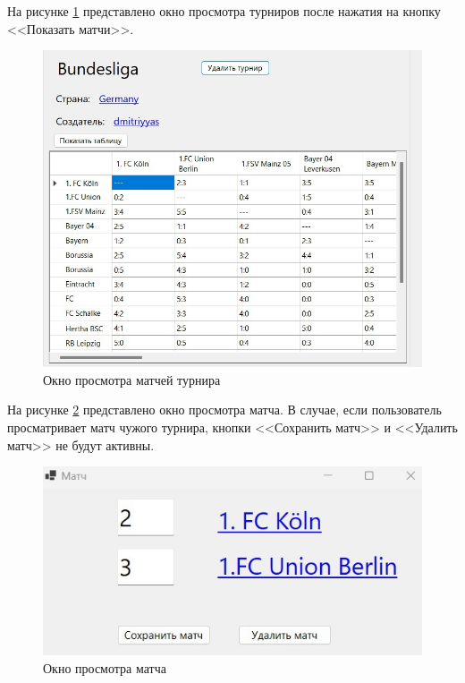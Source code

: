 На рисунке \ref{img:tou2} представлено окно просмотра турниров после нажатия на кнопку <<Показать матчи>>.
\begin{figure}
  \centering
  \includegraphics[scale=0.45]{inc/tours2.jpg}
  \caption{Окно просмотра матчей турнира}
  \label{img:tou2}
\end{figure}

На рисунке \ref{img:mat} представлено окно просмотра матча. В случае, если пользователь просматривает матч чужого турнира, кнопки <<Сохранить матч>> и <<Удалить матч>> не будут активны.
\begin{figure}
  \centering
  \includegraphics[scale=0.5]{inc/match.jpg}
  \caption{Окно просмотра матча}
  \label{img:mat}
\end{figure}

